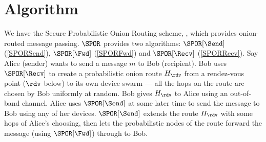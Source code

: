 \section{Algorithm}%
\label{Algorithm}


\newcommand{\Alice}{\ensuremath{\mathscr{A}}}
\newcommand{\Bob}{\ensuremath{\mathscr{B}}}

\newcommand{\localoverlay}{Squad Overlay\xspace}
\newcommand{\globaloverlay}{Global Overlay\xspace}



We have the Secure Probabilistic Onion Routing scheme, \SPOR, which provides 
onion-routed message passing.
\(\SPOR\) provides two algorithms: \(\SPOR[\Send]\) (\cref{SPORSend}), 
\(\SPOR[\Fwd]\) (\cref{SPORFwd}) and \(\SPOR[\Recv]\) (\cref{SPORRecv}).
Say Alice (sender) wants to send a message \(m\) to Bob (recipient).
Bob uses \(\SPOR[\Recv]\) to create a probabilistic onion route \(H_\rdv\) from 
a rendez-vous point (\(\rdv\) below) to its own device swarm --- all the hops on 
the route are chosen by Bob uniformly at random.
Bob gives \(H_\rdv\) to Alice using an out-of-band channel.
Alice uses \(\SPOR[\Send]\) at some later time to send the message to Bob using 
any of her devices.
\(\SPOR[\Send]\) extends the route \(H_\rdv\) with some hops of Alice's 
choosing, then lets the probabilistic nodes of the route forward the message 
(using \(\SPOR[\Fwd]\)) through to Bob.


